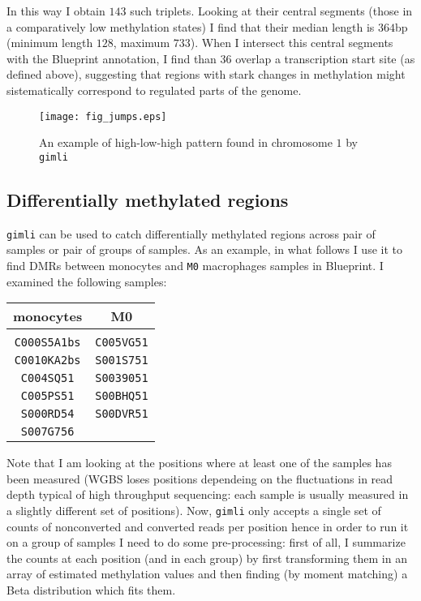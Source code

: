 \documentclass[12pt]{amsart}
\newcommand{\gimli}{\texttt{gimli}}
\begin{document}
In this way I obtain $143$ such triplets. Looking at their central segments
(those in a comparatively low methylation states) I find that their median length is
$364$bp (minimum length $128$, maximum $733$). When I intersect this central segments with the Blueprint
annotation, I find than $36$ overlap a transcription start site (as defined above), 
suggesting that regions with stark 
changes in methylation
might sistematically correspond to regulated parts of the genome.

\begin{figure}
\texttt{[image: fig\_jumps.eps]}
\caption{An example of high-low-high pattern found in chromosome $1$ by \gimli{}}
\label{fig_jumps}
\end{figure}

\subsection{Differentially methylated regions}

\gimli{} can be used to catch differentially methylated regions across pair of samples
or pair of groups of samples.
As an example, in what follows I use it to find DMRs between monocytes and \texttt{M0} macrophages 
samples in Blueprint.  I examined the following samples:

\begin{center}
\begin{tabular}{c|c}
monocytes & M0  \\
\hline \\
\texttt{C000S5A1bs} & \texttt{C005VG51} \\
\texttt{C0010KA2bs} & \texttt{S001S751} \\
\texttt{C004SQ51} & \texttt{S0039051} \\
\texttt{C005PS51} & \texttt{S00BHQ51}\\
\texttt{S000RD54} & \texttt{S00DVR51} \\
\texttt{S007G756} &  \\
\hline
\end{tabular}
\end{center}
 
Note that I am looking at the positions where at least one of the samples has been 
measured (WGBS loses positions dependeing on the fluctuations in read depth 
typical of high throughput sequencing: 
each sample is usually measured in a slightly different set of positions).
Now, \gimli{} only accepts a single set of counts of nonconverted and converted 
reads per position
hence in order to run it on a group of samples I need to do some pre-processing:  
first of all, I summarize the counts at each position (and in each group) 
by first transforming them in an array of estimated 
methylation values and then finding (by moment matching) a Beta 
distribution which fits them. 
\end{document}
